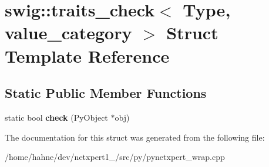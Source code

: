 \hypertarget{structswig_1_1traits__check_3_01Type_00_01value__category_01_4}{}\section{swig\+:\+:traits\+\_\+check$<$ Type, value\+\_\+category $>$ Struct Template Reference}
\label{structswig_1_1traits__check_3_01Type_00_01value__category_01_4}
\subsection*{Static Public Member Functions}
\begin{DoxyCompactItemize}
\item 
static bool {\bfseries check} (Py\+Object $\ast$obj)\hypertarget{structswig_1_1traits__check_3_01Type_00_01value__category_01_4_a7b6a0811d1ac4cb4038c2eb8305411d0}{}\label{structswig_1_1traits__check_3_01Type_00_01value__category_01_4_a7b6a0811d1ac4cb4038c2eb8305411d0}

\end{DoxyCompactItemize}


The documentation for this struct was generated from the following file\+:\begin{DoxyCompactItemize}
\item 
/home/hahne/dev/netxpert1\+\_/src/py/pynetxpert\+\_\+wrap.\+cpp\end{DoxyCompactItemize}
